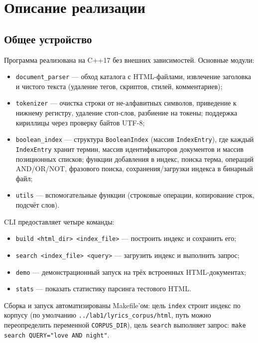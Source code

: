 \section{Описание реализации}

\subsection{Общее устройство}
Программа реализована на C++17 без внешних зависимостей. Основные модули:
\begin{itemize}
    \item \texttt{document\_parser} --- обход каталога с HTML-файлами, извлечение заголовка и чистого текста (удаление тегов, скриптов, стилей, комментариев);
    \item \texttt{tokenizer} --- очистка строки от не-алфавитных символов, приведение к нижнему регистру, удаление стоп-слов, разбиение на токены; поддержка кириллицы через проверку байтов UTF-8;
    \item \texttt{boolean\_index} --- структура \texttt{BooleanIndex} (массив \texttt{IndexEntry}), где каждый \texttt{IndexEntry} хранит термин, массив идентификаторов документов и массив позиционных списков; функции добавления в индекс, поиска терма, операций AND/OR/NOT, фразового поиска, сохранения/загрузки индекса в бинарный файл;
    \item \texttt{utils} --- вспомогательные функции (строковые операции, копирование строк, подсчёт слов).
\end{itemize}

CLI предоставляет четыре команды:
\begin{itemize}
    \item \texttt{build <html\_dir> <index\_file>} --- построить индекс и сохранить его;
    \item \texttt{search <index\_file> <query>} --- загрузить индекс и выполнить запрос;
    \item \texttt{demo} --- демонстрационный запуск на трёх встроенных HTML-документах;
    \item \texttt{stats} --- показать статистику парсинга тестового HTML.
\end{itemize}

Сборка и запуск автоматизированы Makefile'ом: цель \texttt{index} строит индекс
по корпусу (по умолчанию \texttt{../lab1/lyrics\_corpus/html}, путь можно
переопределить переменной \texttt{CORPUS\_DIR}), цель \texttt{search}
выполняет запрос: \texttt{make search QUERY="love AND night"}.

